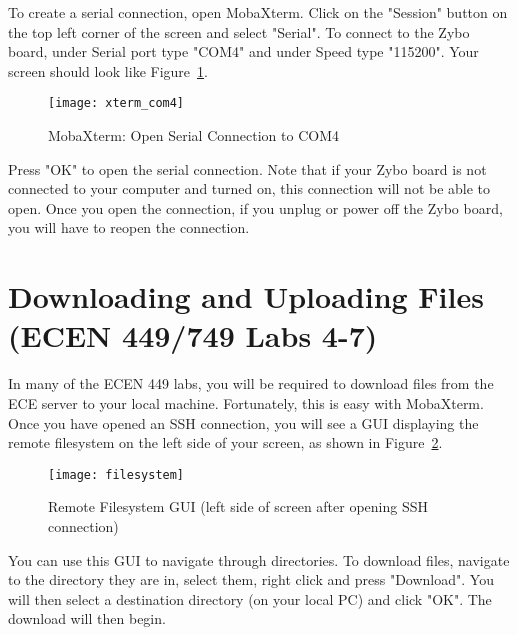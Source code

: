 \documentclass[11pt,twoside,titlepage]{article}
\begin{document}
\noindent
To create a serial connection, open MobaXterm. Click on the "Session" button on the top left corner of the screen and select "Serial". To connect to the Zybo board, under Serial port type "COM4" and under Speed type "115200". Your screen should look like Figure~\ref{xterm_com4}.\\


\begin{figure}[!h]
	\centering 
	\texttt{[image: xterm\_com4]}
	\caption{MobaXterm: Open Serial Connection to COM4}
	\label{xterm_com4}
\end{figure}

\noindent
Press "OK" to open the serial connection. Note that if your Zybo board is not connected to your computer and turned on, this connection will not be able to open. Once you open the connection, if you unplug or power off the Zybo board, you will have to reopen the connection.\\

\section{Downloading and Uploading Files (ECEN 449/749 Labs 4-7)}

\noindent
In many of the ECEN 449 labs, you will be required to download files from the ECE server to your local machine. Fortunately, this is easy with MobaXterm. Once you have opened an SSH connection, you will see a GUI displaying the remote filesystem on the left side of your screen, as shown in Figure~\ref{filesystem}.\\



\begin{figure}[!h]
	\centering 
	\texttt{[image: filesystem]}
	\caption{Remote Filesystem GUI (left side of screen after opening SSH connection)}
	\label{filesystem}
\end{figure}

\noindent
You can use this GUI to navigate through directories. To download files, navigate to the directory they are in, select them, right click and press "Download". You will then select a destination directory (on your local PC) and click "OK". The download will then begin.\\
\end{document}
